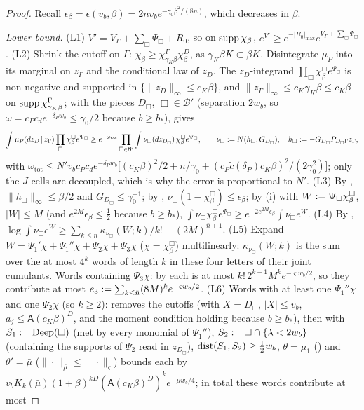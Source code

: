 \begin{proof}
Recall $\epsilon_\beta=\epsilon(v_b,\beta)=2nv_be^{-\gamma_0\beta^2/(8n)}$, which decreases in $\beta$.

\emph{Lower bound.} (L1) $V'=V_\Gamma+\sum_\Box\Psi_\Box+R_0$, so on $\operatorname{supp}\chi_\beta$, $e^{V'}\ge e^{-|R_0|_{\max}}e^{V_\Gamma+\sum_\Box\Psi_\Box}$. (L2) Shrink the cutoff on $\Gamma$: $\chi_\beta\ge\chi^\Gamma_{\gamma_K\beta}\chi^D_\beta$, as $\gamma_K\beta K\subset\beta K$. Disintegrate $\mu_P$ into its marginal on $z_\Gamma$ and the conditional law of $z_D$. The $z_D$-integrand $\prod_\Box\chi^\Box_\beta e^{\Psi_\Box}$ is non-negative and supported in $\{\|z_D\|_\infty\le c_K\beta\}$, and $\|z_\Gamma\|_\infty\le c_K\gamma_K\beta\le c_K\beta$ on $\operatorname{supp}\chi^\Gamma_{\gamma_K\beta}$;  with the pieces $D_\Box$, $\Box\in\mathcal B'$ (separation $2w_b$, so $\omega=c_Pc_de^{-\delta_Pw_b}\le\gamma_0/2$ because $b\ge b_*$), gives
\[
\int\mu_P(dz_D\,|\,z_\Gamma)\prod_\Box\chi^\Box_\beta e^{\Psi_\Box}\ge e^{-\omega_{\mathrm{tot}}}\prod_{\Box\in\mathcal B'}\int\nu_\Box(dz_{D_\Box})\,\chi^\Box_\beta e^{\Psi_\Box},\qquad\nu_\Box:= N(h_\Box,G_{D_\Box}),\quad h_\Box:=-G_{D_\Box}P_{D_\Box\Gamma}z_\Gamma,
\]
with $\omega_{\mathrm{tot}}\le N'v_bc_Pc_de^{-\delta_Pw_b}\big[(c_K\beta)^2/2+n/\gamma_0+(c_P\tilde c(\delta_P)c_K\beta)^2/(2\gamma_0^2)\big]$; only the $J$-cells are decoupled, which is why the error is proportional to $N'$. (L3) By , $\|h_\Box\|_\infty\le\beta/2$ and $G_{D_\Box}\le\gamma_0^{-1}$; by , $\nu_\Box(1-\chi^\Box_\beta)\le\epsilon_\beta$; by (i) with $W:=\Psi_\Box\chi^\Box_\beta$, $|W|\le M$ (and $e^{2M}\epsilon_\beta\le\frac12$ because $b\ge b_*$), $\int\nu_\Box\chi^\Box_\beta e^{\Psi_\Box}\ge e^{-2e^{2M}\epsilon_\beta}\int\nu_\Box e^{W}$. (L4) By , $\log\int\nu_\Box e^{W}\ge\sum_{k\le\bar n}\kappa_{\nu_\Box}(W;k)/k!-(2M)^{\bar n+1}$. (L5) Expand $W=\Psi_1'\chi+\Psi_1''\chi+\Psi_2\chi+\Psi_3\chi$ ($\chi=\chi^\Box_\beta$) multilinearly: $\kappa_{\nu_\Box}(W;k)$ is the sum over the at most $4^k$ words of length $k$ in these four letters of their joint cumulants. Words containing $\Psi_3\chi$: by  each is at most $k!\,2^{k-1}M^ke^{-\varsigma w_b/2}$, so they contribute at most $e_3:=\sum_{k\le\bar n}(8M)^ke^{-\varsigma w_b/2}$. (L6) Words with at least one $\Psi_1''\chi$ and one $\Psi_2\chi$ (so $k\ge2$):  removes the cutoffs (with $X=D_\Box$, $|X|\le v_b$, $a_j\le\mathsf A(c_K\beta)^D$, and the moment condition holding because $b\ge b_*$), then  with $S_1:=\mathrm{Deep}(\Box)$ (met by every monomial of $\Psi_1''$), $S_2:=\Box\cap\{\lambda<2w_b\}$ (containing the supports of $\Psi_2$ read in $z_{D_\Box}$), $\operatorname{dist}(S_1,S_2)\ge\frac12w_b$, $\theta=\mu_1$ () and $\theta'=\bar\mu$ ($\|\cdot\|_{\bar\mu}\le\|\cdot\|_\varsigma$) bounds each by $v_bK_k(\bar\mu)(1+\beta)^{kD}(\mathsf A(c_K\beta)^D)^ke^{-\bar\mu w_b/4}$; in total these words contribute at most

\end{proof}
